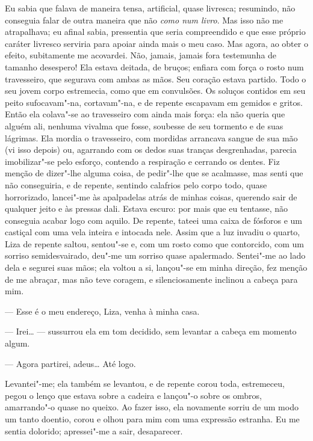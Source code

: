 Eu sabia que falava de maneira tensa, artificial, quase livresca;
resumindo, não conseguia falar de outra maneira que não \textit{como num
livro}. Mas isso não me atrapalhava; eu afinal sabia, pressentia que
seria compreendido e que esse próprio caráter livresco serviria para
apoiar ainda mais o meu caso. Mas agora, ao obter o efeito, subitamente
me acovardei. Não, jamais, jamais fora testemunha de tamanho desespero!
Ela estava deitada, de bruços; enfiara com força o rosto num
travesseiro, que segurava com ambas as mãos. Seu coração estava
partido. Todo o seu jovem corpo estremecia, como que em convulsões. Os
soluços contidos em seu peito sufocavam"-na, cortavam"-na, e de repente
escapavam em gemidos e gritos. Então ela colava"-se ao travesseiro com
ainda mais força: ela não queria que alguém ali, nenhuma vivalma que
fosse, soubesse de seu tormento e de suas lágrimas. Ela mordia o
travesseiro, com mordidas arrancava sangue de sua mão (vi isso depois)
ou, agarrando com os dedos suas tranças desgrenhadas, parecia
imobilizar"-se pelo esforço, contendo a respiração e cerrando os dentes.
Fiz menção de dizer"-lhe alguma coisa, de pedir"-lhe que se acalmasse,
mas senti que não conseguiria, e de repente, sentindo calafrios pelo
corpo todo, quase horrorizado, lancei"-me às apalpadelas atrás de minhas
coisas, querendo sair de qualquer jeito e às pressas dali. Estava
escuro: por mais que eu tentasse, não conseguia acabar logo com aquilo.
De repente, tateei uma caixa de fósforos e um castiçal com uma vela
inteira e intocada nele. Assim que a luz invadiu o quarto, Liza de
repente saltou, sentou"-se e, com um rosto como que contorcido, com um
sorriso semidesvairado, deu"-me um sorriso quase apalermado. Sentei"-me
ao lado dela e segurei suas mãos; ela voltou a si, lançou"-se em minha
direção, fez menção de me abraçar, mas não teve coragem, e
silenciosamente inclinou a cabeça para mim.


--- Esse é o meu endereço, Liza, venha à minha casa.

--- Irei\ldots{} --- sussurrou ela em tom decidido, sem levantar a cabeça em
momento algum.

--- Agora partirei, adeus\ldots{} Até logo.

Levantei"-me; ela também se levantou, e de repente corou toda,
estremeceu, pegou o lenço que estava sobre a cadeira e lançou"-o sobre
os ombros, amarrando"-o quase no queixo. Ao fazer isso, ela novamente
sorriu de um modo um tanto doentio, corou e olhou para mim com uma
expressão estranha. Eu me sentia dolorido; apressei"-me a sair,
desaparecer.


